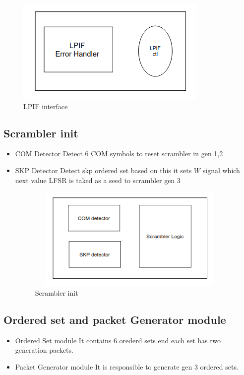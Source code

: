   \begin{figure}[H]
  \centering
  \includegraphics{images/lpif_1.png}
  \caption{LPIF interface}
  
  \label{fig:pipe}
\end{figure}

\subsection{Scrambler init}
\begin{itemize}
    \item COM Detector \newline
    Detect 6 COM symbols to reset scrambler in gen 1,2
    \item SKP Detector \newline
    Detect skp ordered set based on this it sets $W$ signal which next value LFSR is taked as a seed to scrambler gen 3
\begin{figure}[H]
  \centering
  \includegraphics[height=50mm,width=100mm]{images/init.png}
  \caption{Scrambler init}
\end{figure}

\end{itemize}


\subsection{Ordered set and packet Generator module}
\begin{itemize}
    \item Ordered Set module \newline It contains 6 orederd sets end each set has two generation packets. 
\item Packet Generator module \newline It is responsible to  generate gen 3 ordered sets.
\end{itemize}

